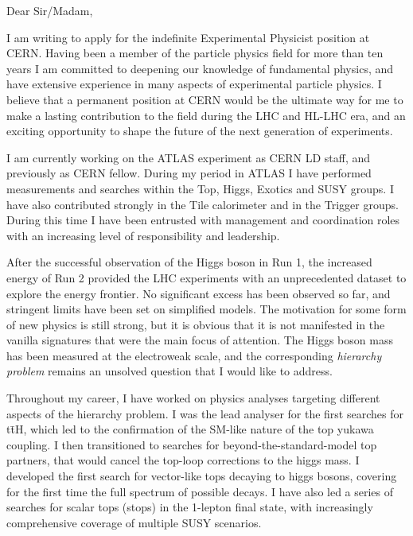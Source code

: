 \documentclass[11pt,a4paper,sans]{moderncv}        %
\begin{document}
\makecvtitle
\cvitem{}{
}

Dear Sir/Madam,
\newline

I am writing to apply for the indefinite Experimental Physicist position at CERN.
Having been a member of the particle physics field for more than ten years I am committed to deepening our knowledge of fundamental physics, and have extensive experience in many aspects of experimental particle physics. I believe that a permanent position at CERN would be the ultimate way for me to make a lasting contribution to the field during the LHC and HL-LHC era, and an exciting opportunity to shape the future of the next generation of experiments.
\newline

I am currently working on the ATLAS experiment as CERN LD staff, and previously as CERN fellow. During my period in ATLAS I have performed measurements and searches within the Top, Higgs, Exotics and SUSY groups. I have also contributed strongly in the Tile calorimeter and in the Trigger groups. During this time I have been entrusted with management and coordination roles with an increasing level of responsibility and leadership. 
\newline

After the successful observation of the Higgs boson in Run 1, the increased energy of Run 2 provided the LHC experiments with an unprecedented dataset to explore the energy frontier. No significant excess has been observed so far, and stringent limits have been set on simplified models.
The motivation for some form of new physics is still strong, but it is obvious that it is not manifested in the vanilla signatures that were the main focus of attention.
The Higgs boson mass has been measured at the electroweak scale, and the corresponding \emph{hierarchy problem} remains an unsolved question that I would like to address.
\newline

Throughout my career, I have worked on physics analyses targeting different aspects of the hierarchy problem. I was the lead analyser for the first searches for t\=tH, which led to the confirmation of the SM-like nature of the top yukawa coupling. I then transitioned to searches for beyond-the-standard-model top partners, that would cancel the top-loop corrections to the higgs mass. I developed the first search for vector-like tops decaying to higgs bosons, covering for the first time the full spectrum of possible decays. I have also led a series of searches for scalar tops (stops) in the 1-lepton final state, with increasingly comprehensive coverage of multiple SUSY scenarios.
\newline
\end{document}
